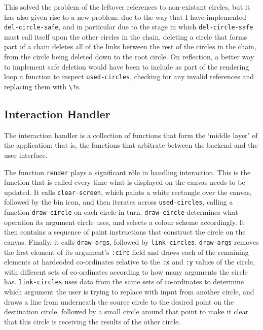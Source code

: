 \documentclass[12pt,twoside,notitlepage,xetex]{report}
\begin{document}
This solved the problem of the leftover references to non-existant circles, but
it has also given rise to a new problem: due to the way that I have implemented
\verb¬del-circle-safe¬, and in particular due to the stage in which
\verb¬del-circle-safe¬ must call itself upon the other circles in the chain,
deleting a circle that forms part of a chain deletes all of the links between
the rest of the circles in the chain, from the circle being deleted down to the
root circle.  On reflection, a better way to implement safe deletion would have
been to include as part of the rendering loop a function to inspect
\verb¬used-circles¬, checking for any invalid references and replacing them
with \verb¬\?¬s.

\subsection{Interaction Handler}
%

The interaction handler is a collection of functions that form the `middle
layer' of the application: that is, the functions that arbitrate between the
backend and the user interface.

The function \verb¬render¬ plays a significant rôle in handling interaction.
This is the function that is called every time what is displayed on the canvas
needs to be updated.  It calls \verb¬clear-screen¬, which paints a white
rectangle over the canvas, followed by the bin icon, and then iterates across
\verb¬used-circles¬, calling a function \verb¬draw-circle¬ on each circle in
turn.  \verb¬draw-circle¬ determines what operation its argument circle uses,
and selects a colour scheme accordingly.  It then contains a sequence of paint
instructions that construct the circle on the canvas.  Finally, it calls
\verb¬draw-args¬, followed by \verb¬link-circles¬.  \verb¬draw-args¬ removes
the first element of its argument's \verb¬:circ¬ field and draws each of the
remaining elements at hardcoded co-ordinates relative to the \verb¬:x¬ and
\verb¬:y¬ values of the circle, with different sets of co-ordinates according
to how many arguments the circle has.  \verb¬link-circles¬ uses data from the
same sets of co-ordinates to determine which argument the user is trying to
replace with input from another circle, and draws a line from underneath the
source circle to the desired point on the destination circle, followed by a
small circle around that point to make it clear that this circle is receiving
the results of the other circle.
\end{document}
